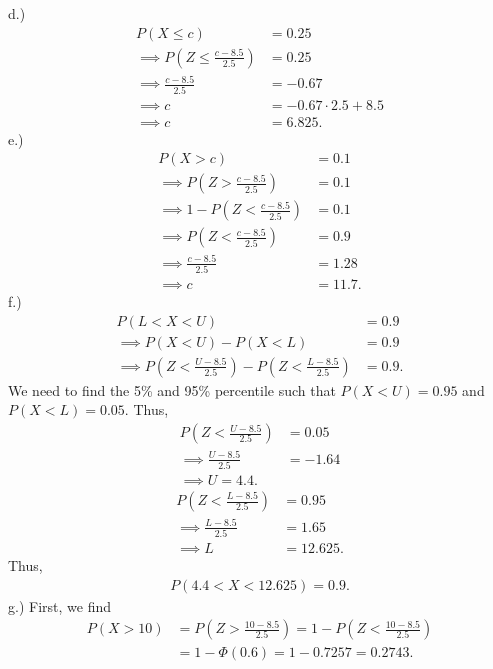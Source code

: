 \documentclass{report}
\begin{document}
 \bigbreak \noindent 
 d.)
 \begin{align*}
     P(X \leq c) &= 0.25 \\
     \implies P\left(Z \leq \frac{c-8.5}{2.5}\right) &= 0.25 \\
     \implies \frac{c-8.5}{2.5} &= -0.67 \\
     \implies c &= -0.67 \cdot 2.5 + 8.5 \\
     \implies c &= 6.825
 .\end{align*}
 \bigbreak \noindent 
 e.)
 \begin{align*}
     P(X > c) &= 0.1 \\
     \implies P\left(Z > \frac{c - 8.5}{2.5}\right) &= 0.1 \\
     \implies 1- P\left(Z < \frac{c - 8.5}{2.5}\right) &= 0.1 \\
     \implies P\left(Z < \frac{c - 8.5}{2.5}\right) &=0.9 \\
     \implies \frac{c-8.5}{2.5} &= 1.28 \\
     \implies c &=11.7
 .\end{align*}
 \bigbreak \noindent 
 f.) 
 \begin{align*}
     P(L < X < U) &= 0.9 \\
     \implies P(X < U) - P(X < L) &=0.9 \\
     \implies P\left(Z < \frac{U-8.5}{2.5}\right) - P\left(Z <\frac{L-8.5}{2.5}\right) &= 0.9
 .\end{align*}
 \bigbreak \noindent 
 We need to find the 5\% and 95\% percentile such that $P(X < U) = 0.95$ and $P(X < L) = 0.05$. Thus,
 \begin{align*}
     P\left(Z < \frac{U-8.5}{2.5}\right) &= 0.05 \\
     \implies \frac{U-8.5}{2.5} &= -1.64 \\
     \implies U=4.4
 .\end{align*}
 \begin{align*}
     P\left(Z < \frac{L-8.5}{2.5}\right) &= 0.95 \\
     \implies \frac{L-8.5}{2.5} &= 1.65 \\
                                \implies L&=12.625
 .\end{align*}
 \bigbreak \noindent 
 Thus,
 \begin{align*}
     P(4.4 < X < 12.625) = 0.9
 .\end{align*}
 \bigbreak \noindent 
 g.) First, we find
 \begin{align*}
     P(X > 10) &= P\left(Z > \frac{10-8.5}{2.5}\right) = 1- P\left(Z < \frac{10-8.5}{2.5}\right) \\
               &=1-\Phi(0.6) = 1-0.7257 = 0.2743
 .\end{align*}
\end{document}
